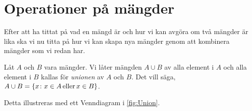 \section{Operationer på mängder}
\label{sec:Mangdoperationer}
Efter att ha tittat på vad en mängd är och hur vi kan avgöra om
två mängder är lika ska vi nu titta på hur vi kan skapa nya mängder genom att
kombinera mängder som vi redan har.

\begin{definition}\label{def:Union}
  Låt \(A\) och \(B\) vara mängder.
  Vi låter mängden \(A\cup B\) av alla element i \(A\) och alla element i
  \(B\) kallas för \emph{unionen} av \(A\) och \(B\).
  Det vill säga, \(A\cup B = \{x\colon x\in A\operatorname{eller} x\in B\}\).
\end{definition}
Detta illustreras med ett Venndiagram i \cref{fig:Union}.
